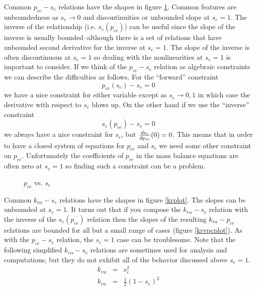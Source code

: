 \documentclass[10pt,dvips,twoside,reqno]{amsart}
\begin{document}
Common $p_{ce}-s_e$ relations have the shapes in figure \ref{psplot}.
Common features are unboundedness as $s_e \rightarrow 0$ and
discontinuities or unbounded slope at $s_e=1$. The inverse of the
relationship (i.e. $s_e(p_{ce})$) can be useful since the slope of the
inverse is usually bounded--although there is a set of relations that
have unbounded second derivative for the inverse at $s_e=1$. The slope
of the inverse is often discontinuous at $s_e=1$ so dealing with the
nonlinearities at $s_e=1$ is important to consider. If we think of the
$p_{ce}-s_e$ relation as algebraic constraints we can describe the
difficulties as follows. For the ``forward'' constraint
\begin{equation}
  \label{eq:fp}
   p_{ce}(s_e) - s_e = 0
\end{equation}
we have a nice constraint for either variable except as
$s_e\rightarrow 0,1$ in which case the derivative with respect to
$s_e$ blows up. On the other hand if we use the ``inverse''
constraint
\begin{equation}
  \label{eq:fs}
  s_e(p_{ce}) - s_e = 0
\end{equation}
we always have a nice constraint for $s_e$, but
$\frac{d {s_e}}{d {p_{ce}}}(0)=0$. This means that in order to have a closed
system of equations for $p_{ce}$ and $s_e$ we need some other
constraint on $p_{ce}$. Unfortunately the coefficients of $p_{ce}$ in
the mass balance equations are often zero at $s_e = 1$ so finding such
a constraint can be a problem.
\begin{figure}
\center
\caption{$p_{ce}$ vs. $s_e$ \label{psplot}}
\end{figure}

Common $k_{r \alpha}-s_e$ relations have the shapes in figure
\ref{krplot}. The slopes can be unbounded at $s_e=1$. It turns out
that if you compose the $k_{r \alpha}-s_e$ relation with the inverse
of the $s_e(p_{ce})$ relation then the slopes of the resulting $k_{r
  \alpha}-p_{ce}$ relations are bounded for all but a small range of
cases (figure \ref{krvpcplot}). As with the $p_{ce}-s_e$ relation, the
$s_e=1$ case can be troublesome. Note that the following simplified
$k_{r \alpha}-s_e$ relations are sometimes used for analysis and
computations, but they do not exhibit all of the behavior discussed
above $s_e=1$.
\begin{eqnarray}
  \label{eq:krwSimple}
  k_{rw} &=& s_e^2 \\
  k_{rn} &=& \frac{1}{2}(1 - s_e)^2 \label{eq:krnSimple}
\end{eqnarray}
\end{document}
